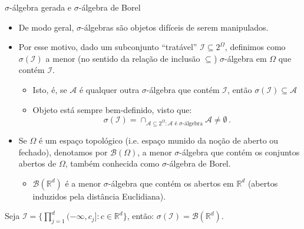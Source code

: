 \documentclass[11pt]{beamer}
\begin{document}
\begin{frame}{$\sigma$-álgebra gerada e $\sigma$-álgebra de Borel}
	\begin{itemize}
		\item De modo geral, $\sigma$-álgebras são objetos difíceis de serem manipulados.
		\item Por esse motivo, dado um subconjunto ``tratável'' $\mathcal{I}\subseteq 2^\Omega$, definimos como $\sigma(\mathcal{I})$ a menor (no sentido da relação de inclusão $\subseteq$) $\sigma$-álgebra em $\Omega$ que contém $\mathcal{I}$.
			\begin{itemize}
				\item Isto, é, se $\mathcal{A}$ é qualquer outra $\sigma$-álgebra que contém $\mathcal{I}$, então $\sigma(\mathcal{I}) \subseteq \mathcal{A}$
				\item Objeto está sempre bem-definido, visto que:
				$$\sigma(\mathcal{I}) = \cap_{\mathcal{A}\subseteq 2^\Omega: \mathcal{A} \text{ é $\sigma$-álgebra} } \mathcal{A} \neq \emptyset\, .$$
			\end{itemize}
			\item Se $\Omega$ é um espaço topológico (i.e. espaço munido da noção de aberto ou fechado), denotamos por $\mathcal{B}(\Omega)$, a menor $\sigma$-álgebra que contém os conjuntos abertos de $\Omega$, também conhecida como $\sigma$-álgebra de Borel.
			\begin{itemize}
				\item $\mathcal{B}(\mathbb{R}^d)$ é a menor $\sigma$-álgebra  que contém os abertos em $\mathbb{R}^d$ (abertos induzidos pela distância Euclidiana).
			\end{itemize}
	\end{itemize}
	\begin{lemma}
		Seja $\mathcal{I} = \{ \prod_{j=1}^d(-\infty, c_j] : c \in \mathbb{R}^d\}$, então:
		$\sigma(\mathcal{I}) = \mathcal{B}(\mathbb{R}^d)$.
	\end{lemma}
\end{frame}
\end{document}
